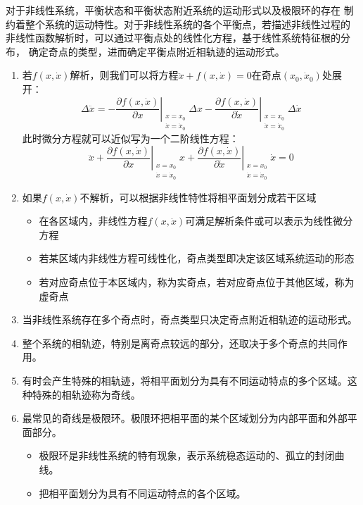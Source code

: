 对于非线性系统，平衡状态和平衡状态附近系统的运动形式以及极限环的存在
制约着整个系统的运动特性。对于非线性系统的各个平衡点，若描述非线性过程的
非线性函数解析时，可以通过平衡点处的线性化方程，基于线性系统特征根的分布，
确定奇点的类型，进而确定平衡点附近相轨迹的运动形式。

\begin{enumerate}
    \item 若$f(x,\dot{x})$解析，则我们可以将方程$\ddot{x} + f(x,\dot{x}) = 0$在奇点$(x_0,\dot{x}_0)$处展开：
    \[
    \Delta \ddot{x}
    = - \left. \frac{\partial f(x,\dot{x})}{\partial x} \right|_{\substack{x=x_0\\ \dot{x}=\dot{x}_0}} \Delta x
    - \left. \frac{\partial f(x,\dot{x})}{\partial \dot{x}} \right|_{\substack{x=x_0\\ \dot{x}=\dot{x}_0}} \Delta \dot{x}
    \]
    此时微分方程就可以近似写为一个二阶线性方程：
    \[
         \ddot{x}
     + \left. \frac{\partial f(x,\dot{x})}{\partial x} \right|_{\substack{x=x_0\\ \dot{x}=\dot{x}_0}}  x
    + \left. \frac{\partial f(x,\dot{x})}{\partial \dot{x}} \right|_{\substack{x=x_0\\ \dot{x}=\dot{x}_0}}  \dot{x} = 0
    \]
    \item 如果$f(x,\dot{x})$不解析，可以根据非线性特性将相平面划分成若干区域
    \begin{itemize}
        \item 在各区域内，非线性方程$f(x,\dot{x})$可满足解析条件或可以表示为线性微分方程
        \item 若某区域内非线性方程可线性化，奇点类型即决定该区域系统运动的形态
        \item 若对应奇点位于本区域内，称为实奇点，若对应奇点位于其他区域，称为虚奇点
    \end{itemize}
    \item 当非线性系统存在多个奇点时，奇点类型只决定奇点附近相轨迹的运动形式。
    \item 整个系统的相轨迹，特别是离奇点较远的部分，还取决于多个奇点的共同作用。
    \item 有时会产生特殊的相轨迹，将相平面划分为具有不同运动特点的多个区域。这种特殊的相轨迹称为奇线。
    \item 最常见的奇线是极限环。极限环把相平面的某个区域划分为内部平面和外部平面部分。
    \begin{itemize}
        \item 极限环是非线性系统的特有现象，表示系统稳态运动的、孤立的封闭曲线。
        \item 把相平面划分为具有不同运动特点的各个区域。

\end{itemize}
\end{enumerate}
